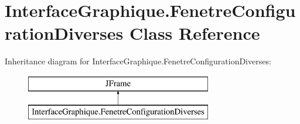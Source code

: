 \hypertarget{class_interface_graphique_1_1_fenetre_configuration_diverses}{\section{Interface\-Graphique.\-Fenetre\-Configuration\-Diverses Class Reference}
\label{class_interface_graphique_1_1_fenetre_configuration_diverses}
}
Inheritance diagram for Interface\-Graphique.\-Fenetre\-Configuration\-Diverses\-:\begin{figure}[H]
\begin{center}
\leavevmode
\includegraphics[height=2.000000cm]{class_interface_graphique_1_1_fenetre_configuration_diverses}
\end{center}
\end{figure}
